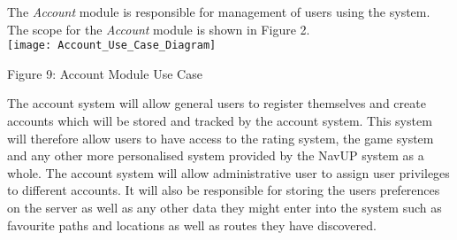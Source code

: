 The \textit{Account} module is responsible for management of users using the system. The scope for the \textit{Account} module is shown in Figure 2.  \\[1cm]

\texttt{[image: Account\_Use\_Case\_Diagram]}
\begin{center}
	Figure 9: Account Module Use Case
\end{center}

{The account system will allow general users to register themselves and create accounts which will be stored and tracked by the account system. This system will therefore allow users to have access to the rating system, the game system and any other more personalised system provided by the NavUP system as a whole. The account system will allow administrative user to assign user privileges to different accounts. It will also be responsible for storing the users preferences on the server as well as any other data they might enter into the system such as favourite paths and locations as well as routes they have discovered.}
		
		
		
	
	
